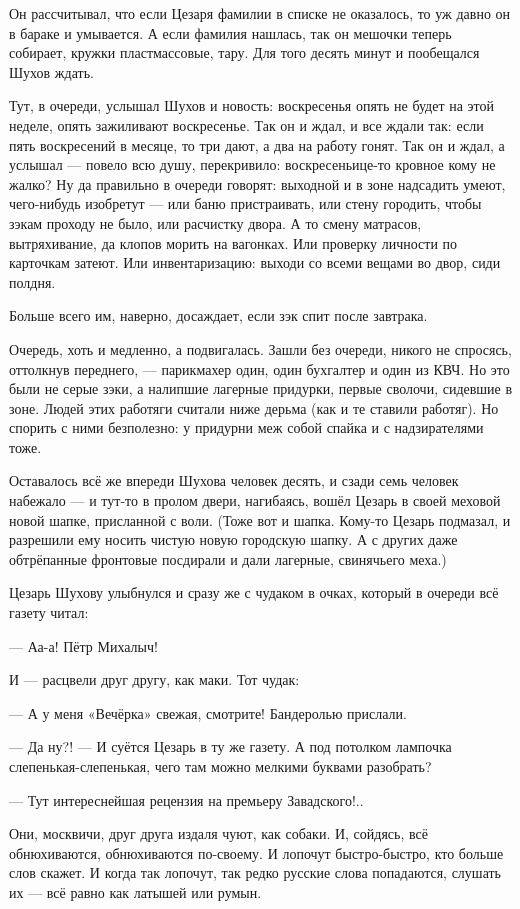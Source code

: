 Он рассчитывал, что если Цезаря фамилии в списке не оказалось, то уж давно он в бараке и
умывается. А если фамилия нашлась, так он мешочки теперь собирает, кружки пластмассовые,
тару. Для того десять минут и пообещался Шухов ждать.

Тут, в очереди, услышал Шухов и новость: воскресенья опять не будет на этой неделе, опять
зажиливают воскресенье. Так он и ждал, и все ждали так: если пять воскресений в месяце, то три
дают, а два на работу гонят. Так он и ждал, а услышал --- повело всю душу, перекривило:
воскресеньице-то кровное кому не жалко? Ну да правильно в очереди говорят: выходной и в зоне
надсадить умеют, чего-нибудь изобретут --- или баню пристраивать, или стену городить, чтобы
зэкам проходу не было, или расчистку двора. А то смену матрасов, вытряхивание, да клопов
морить на вагонках. Или проверку личности по карточкам затеют. Или инвентаризацию: выходи со
всеми вещами во двор, сиди полдня.

Больше всего им, наверно, досаждает, если зэк спит после завтрака.

Очередь, хоть и медленно, а подвигалась. Зашли без очереди, никого не спросясь, оттолкнув
переднего, --- парикмахер один, один бухгалтер и один из КВЧ. Но это были не серые зэки, а
налипшие лагерные придурки, первые сволочи, сидевшие в зоне. Людей этих работяги считали
ниже дерьма (как и те ставили работяг). Но спорить с ними безполезно: у придурни меж собой
спайка и с надзирателями тоже.

Оставалось всё же впереди Шухова человек десять, и сзади семь человек набежало --- и тут-то в
пролом двери, нагибаясь, вошёл Цезарь в своей меховой новой шапке, присланной с воли. (Тоже
вот и шапка. Кому-то Цезарь подмазал, и разрешили ему носить чистую новую городскую шапку. А с
других даже обтрёпанные фронтовые посдирали и дали лагерные, свинячьего меха.)

Цезарь Шухову улыбнулся и сразу же с чудаком в очках, который в очереди всё газету читал:

--- Аа-а! Пётр Михалыч!

И --- расцвели друг другу, как маки. Тот чудак:

--- А у меня «Вечёрка» свежая, смотрите! Бандеролью прислали.

--- Да ну?! --- И суётся Цезарь в ту же газету. А под потолком лампочка слепенькая-слепенькая,
чего там можно мелкими буквами разобрать?

--- Тут интереснейшая рецензия на премьеру Завадского!..

Они, москвичи, друг друга издаля чуют, как собаки. И, сойдясь, всё обнюхиваются, обнюхиваются
по-своему. И лопочут быстро-быстро, кто больше слов скажет. И когда так лопочут, так редко
русские слова попадаются, слушать их --- всё равно как латышей или румын.

